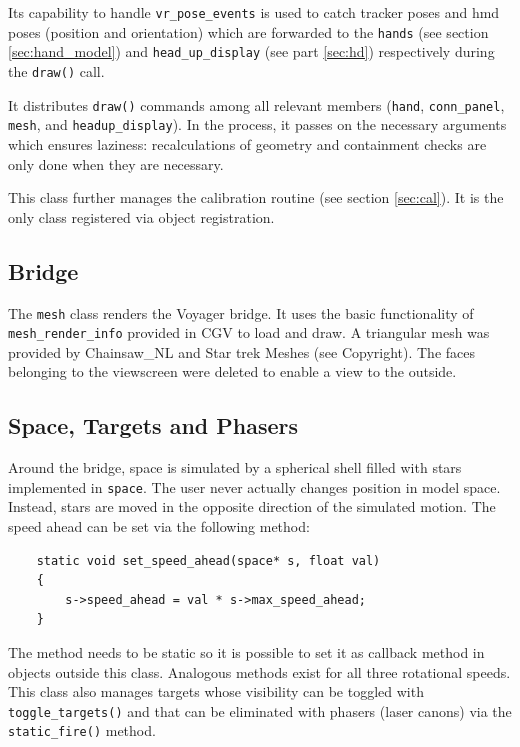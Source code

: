 \documentclass[hyperref, bachelorofscience]{cgvpub}
\begin{document}
Its capability to handle \lstinline|vr_pose_events| is used to catch tracker poses and \acrshort{hmd} poses (position and orientation) which are forwarded to the \lstinline|hands| (see section \ref{sec:hand_model}) and \lstinline|head_up_display| (see part \ref{sec:hd}) respectively during the \lstinline|draw()| call. 

It distributes \lstinline|draw()| commands among all relevant members (\lstinline|hand|, \lstinline|conn_panel|, \lstinline|mesh|, and \lstinline|headup_display|). In the process, it passes on the necessary arguments which ensures laziness: recalculations of geometry and containment checks are only done when they are necessary.

This class further manages the calibration routine (see section \ref{sec:cal}). It is the only class registered via object registration.

\subsection{Bridge}
The \lstinline|mesh| class renders the Voyager bridge. It uses the basic functionality of \lstinline|mesh_render_info| provided in \gls{CGV} to load and draw. A triangular mesh was provided by Chainsaw\_NL and Star trek Meshes (see Copyright). The faces belonging to the viewscreen were deleted to enable a view to the outside.

\subsection{Space, Targets and Phasers}
Around the bridge, space is simulated by a spherical shell filled with stars implemented in \lstinline|space|. The user never actually changes position in model space. Instead, stars are moved in the opposite direction of the simulated motion. The speed ahead can be set via the following method: 
\begin{lstlisting}
	static void set_speed_ahead(space* s, float val) 
	{ 
		s->speed_ahead = val * s->max_speed_ahead; 
	}
\end{lstlisting}

The method needs to be static so it is possible to set it as callback method in objects outside this class. Analogous methods exist for all three rotational speeds. This class also manages targets whose visibility can be toggled with \lstinline|toggle_targets()| and that can be eliminated with phasers (laser canons) via the \lstinline|static_fire()| method. 
\end{document}
